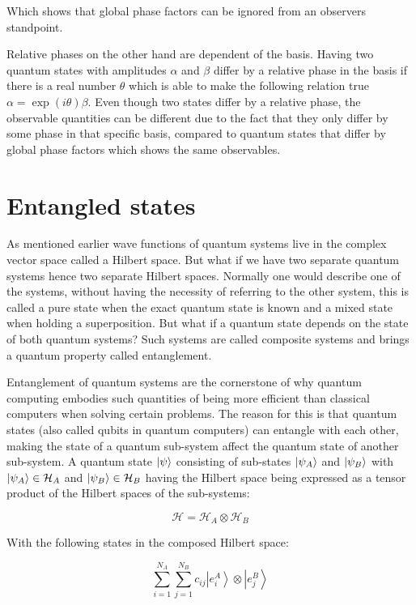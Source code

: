 \documentclass[../main.tex]{subfiles}
\begin{document}
Which shows that global phase factors can be ignored from an observers standpoint.

Relative phases on the other hand are dependent of the basis. Having two quantum states with amplitudes $\alpha$ and $\beta$ differ by a relative phase in the basis if there is a real number $\theta$ which is able to make the following relation true $\alpha=\exp (i \theta) \beta$. Even though two states differ by a relative phase, the observable quantities can be different due to the fact that they only differ by some phase in that specific basis, compared to quantum states that differ by global phase factors which shows the same observables.

\section{Entangled states}
As mentioned earlier wave functions of quantum systems live in the complex vector space called a Hilbert space. But what if we have two separate quantum systems hence two separate Hilbert spaces. Normally one would describe one of the systems, without having the necessity of referring to the other system, this is called a pure state when the exact quantum state is known and a mixed state when holding a superposition. But what if a quantum state depends on the state of both quantum systems? Such systems are called composite systems and brings a quantum property called entanglement\cite[ch.~3]{10.5555/3309066}.

Entanglement of quantum systems are the cornerstone of why quantum computing embodies such quantities of being more efficient than classical computers when solving certain problems. The reason for this is that quantum states (also called qubits in quantum computers) can entangle with each other, making the state of a quantum sub-system affect the quantum state of another sub-system. A quantum state $\ket{\psi}$ consisting of sub-states $\ket{\psi_A}$ and $\ket{\psi_B}$ with $\ket{\psi_A}\in \mathcal{H}_A$ and $\ket{\psi_B}\in \mathcal{H}_B$ having the Hilbert space being expressed as a tensor product of the Hilbert spaces of the sub-systems:

\begin{equation*}
    \mathcal{H}=\mathcal{H}_{A} \otimes \mathcal{H}_{B}
\end{equation*}

With the following states in the composed Hilbert space:

\begin{equation*}
    \sum_{i=1}^{N_{A}} \sum_{j=1}^{N_{B}} c_{i j}\left|e_{i}^{A}\right\rangle \otimes\left|e_{j}^{B}\right\rangle
\end{equation*}
\end{document}
